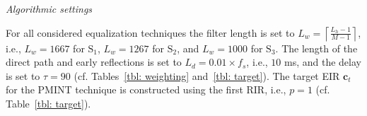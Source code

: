 \documentclass[10pt]{IEEEtran}
\begin{document}

\vskip 5pt
\textit{Algorithmic settings} 
\vskip 5pt

For all considered equalization techniques the filter length is set to $L_w =\left\lceil{\frac{L_h-1}{M-1}}\right\rceil$, i.e., $L_w = 1667$ for $\text{S}_1$, $L_w = 1267$ for $\text{S}_2$, and $L_w = 1000$ for $\text{S}_3$.
The length of the direct path and early reflections is set to $L_d = 0.01 \times f_s$, i.e., $10$ ms, and the delay is set to $\tau = 90$ (cf. Tables~\ref{tbl: weighting} and~\ref{tbl: target}).
The target EIR $\mathbf{c}_t$ for the PMINT technique is constructed using the first RIR, i.e., $p = 1$ (cf. Table~\ref{tbl: target}).
\end{document}

